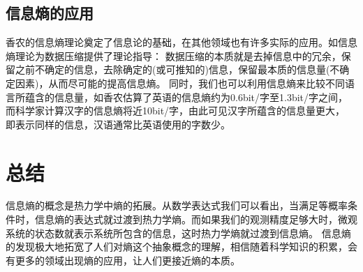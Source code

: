 \documentclass{ctexart}
\begin{document}
\subsection{信息熵的应用}
香农的信息熵理论奠定了信息论的基础，在其他领域也有许多实际的应用。如信息熵理论为数据压缩提供了理论指导：
数据压缩的本质就是去掉信息中的冗余，保留之前不确定的信息，去除确定的(或可推知的)信息，保留最本质的信息量(不确定因素)，从而尽可能的提高信息熵。
同时，我们也可以利用信息熵来比较不同语言所蕴含的信息量，如香农估算了英语的信息熵约为0.6bit/字至1.3bit/字之间\cite{Eng}，而科学家计算汉字的信息熵将近10bit/字，由此可见汉字所蕴含的信息量更大，
即表示同样的信息，汉语通常比英语使用的字数少。
\section{总结}
信息熵的概念是热力学中熵的拓展。从数学表达式我们可以看出，当满足等概率条件时，信息熵的表达式就过渡到热力学熵。而如果我们的观测精度足够大时，微观系统的状态数就表示系统所包含的信息，这时热力学熵就过渡到信息熵。
信息熵的发现极大地拓宽了人们对熵这个抽象概念的理解，相信随着科学知识的积累，会有更多的领域出现熵的应用，让人们更接近熵的本质。

\end{document}
